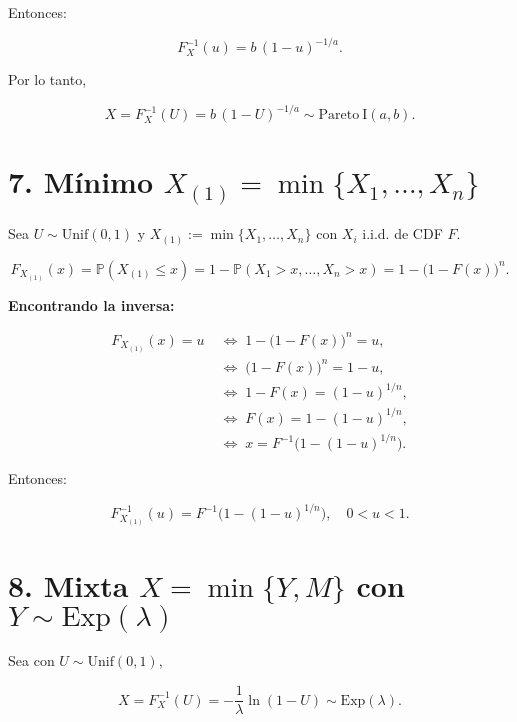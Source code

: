 \documentclass[10pt,a4paper]{article}
\let\le\leqslant
\let\leq\leqslant
\let\le\leq
\let\oldsection\section
\renewcommand{\section}{%
      \clearpage
      \thispagestyle{myfancy}%
      \oldsection
    }
\begin{document}
Entonces:

\[
F_X^{-1}(u)=b\,(1-u)^{-1/a}.
\]

Por lo tanto,

\[
X=F_X^{-1}(U)=b\,(1-U)^{-1/a}\sim\mathrm{Pareto\ I}(a,b).
\]

    \hypertarget{muxednimo-x_1minx_1dotsx_n}{%
\section{\texorpdfstring{7. Mínimo
\(X_{(1)}=\min\{X_1,\dots,X_n\}\)}{7. Mínimo X\_\{(1)\}=\textbackslash min\textbackslash\{X\_1,\textbackslash dots,X\_n\textbackslash\}}}\label{muxednimo-x_1minx_1dotsx_n}}

    Sea \textbf{\(U\sim\mathrm{Unif}(0,1)\)} y
\(X_{(1)}:=\min\{X_1,\dots,X_n\}\) con \(X_i\) i.i.d. de CDF \(F\).

\[
F_{X_{(1)}}(x)=\mathbb P(X_{(1)}\le x)
=1-\mathbb P(X_1>x,\dots,X_n>x)
=1-\bigl(1-F(x)\bigr)^n.
\]

\textbf{Encontrando la inversa:}

\[
\begin{aligned}
F_{X_{(1)}}(x)=u 
&\;\iff\; 1-\bigl(1-F(x)\bigr)^n=u,\\
&\;\iff\; \bigl(1-F(x)\bigr)^n=1-u,\\
&\;\iff\; 1-F(x)=(1-u)^{1/n},\\
&\;\iff\; F(x)=1-(1-u)^{1/n},\\
&\;\iff\; x=F^{-1}\!\bigl(1-(1-u)^{1/n}\bigr).
\end{aligned}
\]

Entonces:

\[
F_{X_{(1)}}^{-1}(u)=F^{-1}\!\bigl(1-(1-u)^{1/n}\bigr),\quad 0<u<1.
\]

    \hypertarget{mixta-xminym-con-ysimmathrmexplambda}{%
\section{\texorpdfstring{8. Mixta \(X=\min\{Y,M\}\) con
\(Y\sim\mathrm{Exp}(\lambda)\)}{8. Mixta X=\textbackslash min\textbackslash\{Y,M\textbackslash\} con Y\textbackslash sim\textbackslash mathrm\{Exp\}(\textbackslash lambda)}}\label{mixta-xminym-con-ysimmathrmexplambda}}

    Sea con \(U\sim\mathrm{Unif}(0,1)\),

\[
X=F_X^{-1}(U)=-\frac{1}{\lambda}\ln(1-U)\sim\mathrm{Exp}(\lambda).
\]
\end{document}
